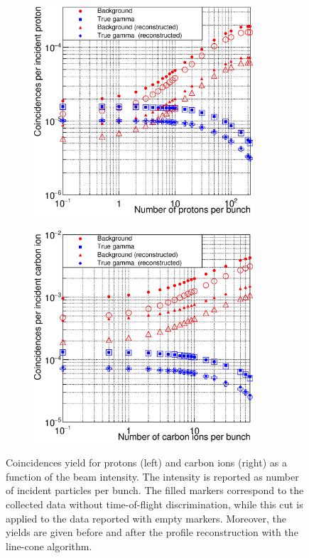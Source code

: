 \begin{figure} [!h]
\begin{subfigure}[b]{.5\textwidth}
\centering
\includegraphics[width=0.9\textwidth]{03_GraphicFiles/chapter4_HTsimu/new/coincYields_protons.eps}
\caption{}
\label{chap4::fig::coincYields_p}
\end{subfigure}
\begin{subfigure}[b]{.5\textwidth}
\centering
\includegraphics[width=0.9\textwidth]{03_GraphicFiles/chapter4_HTsimu/new/coincYields_Cions.eps}
\caption{}
\label{chap4::fig::coincYields_C}
\end{subfigure}
  \caption{Coincidences yield for protons (left) and carbon ions (right) as a function of the beam intensity. The intensity is reported as number of incident particles per bunch. The filled markers correspond to the collected data without time-of-flight discrimination, while this cut is applied to the data reported with empty markers. Moreover, the yields are given before and after the profile reconstruction with the line-cone algorithm.}
\label{chap4::fig::coincidences}
\end{figure}

